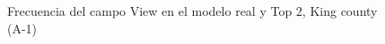 \begin{figure}[H]
    \centering
    
    \caption{Frecuencia del campo View en el modelo real y Top 2, King county (A-1)}
    \label{frecuency-top2-view}
\end{figure}